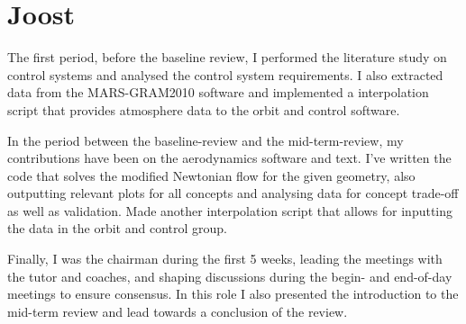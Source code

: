 \section{Joost}

The first period, before the baseline review, I performed the literature study on control systems and analysed the control system requirements. I also extracted data from the MARS-GRAM2010 software and implemented a interpolation script that provides atmosphere data to the orbit and control software.

In the period between the baseline-review and the mid-term-review, my contributions have been on the aerodynamics software and text. I've written the code that solves the modified Newtonian flow for the given geometry, also outputting relevant plots for all concepts and analysing data for concept trade-off as well as validation. Made another interpolation script that allows for inputting the data in the orbit and control group.

Finally, I was the chairman during the first 5 weeks, leading the meetings with the tutor and coaches, and shaping discussions during the begin- and end-of-day meetings to ensure consensus. In this role I also presented the introduction to the mid-term review and lead towards a conclusion of the review.